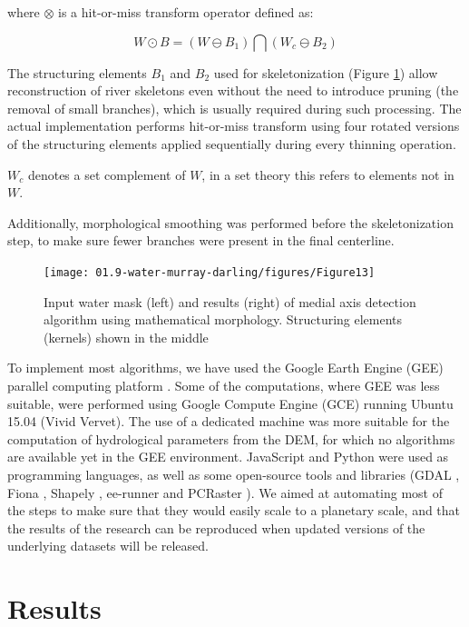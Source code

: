 where $\otimes$ is a hit-or-miss transform operator defined as:

\begin{equation}
W \odot B = \left( W \ominus B_1 \right) \bigcap \left( W_c \ominus B_2 \right)
\end{equation}

The structuring elements $B_1$ and $B_2$ used for skeletonization (Figure \ref{fig:au-skeleton}) allow reconstruction of river skeletons even without the need to introduce pruning (the removal of small branches), which is usually required during such processing. The actual implementation performs hit-or-miss transform using four rotated versions of the structuring elements applied sequentially during every thinning operation.

$W_c$ denotes a set complement of $W$, in a set theory this refers to elements not in $W$. 

Additionally, morphological smoothing was performed before the skeletonization step, to make sure fewer branches were present in the final centerline.

\begin{figure}
	\centering
	\texttt{[image: 01.9-water-murray-darling/figures/Figure13]}
	\caption{Input water mask (left) and results (right) of medial axis detection algorithm using mathematical morphology. Structuring elements (kernels) shown in the middle}
	\label{fig:au-skeleton}
\end{figure}

To implement most algorithms, we have used the Google Earth Engine (GEE) parallel computing platform \citep{Gorelick2012}. Some of the computations, where GEE was less suitable, were performed using Google Compute Engine (GCE) running Ubuntu 15.04 (Vivid Vervet). The use of a dedicated machine was more suitable for the computation of hydrological parameters from the DEM, for which no algorithms are available yet in the GEE environment. JavaScript and Python were used as programming languages, as well as some open-source tools and libraries (GDAL \citep{webGDAL}, Fiona \citep{webFiona}, Shapely \citep{webShapely}, ee-runner \citep{webEErunner} and PCRaster \citep{Karssenberg2010}). We aimed at automating most of the steps to make sure that they would easily scale to a planetary scale, and that the results of the research can be reproduced when updated versions of the underlying datasets will be released.

\section{Results}

